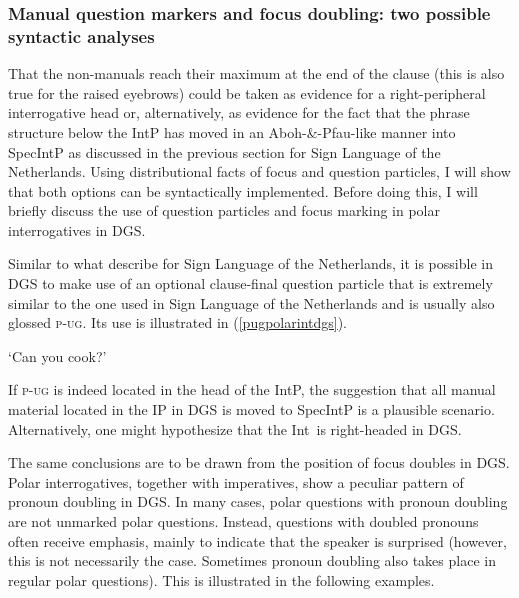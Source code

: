 \subsubsection{Manual question markers and focus doubling: two possible syntactic analyses}\label{manualquestionmarkers}
That the non-manuals reach their maximum at the end of the clause (this is also true for the raised eyebrows) could be taken as evidence for a right-peripheral interrogative head or, alternatively, as evidence for the fact that the phrase structure below the IntP has moved in an Aboh-\&-Pfau-like manner into SpecIntP as discussed in the previous section for Sign Language of the Netherlands. Using distributional facts of focus and question particles, I will show that both options can be syntactically implemented. Before doing this, I will briefly discuss the use of question particles and focus marking in polar interrogatives in DGS.

Similar to what \citet{aboh2010sa} describe for Sign Language of the Netherlands, it is possible in DGS to make use of an optional clause-final question particle that is extremely similar to the one used in Sign Language of the Netherlands and is usually also glossed \textsc{p-ug}. Its use is illustrated in (\ref{pugpolarintdgs}).

\begin{exe}
\ex {}
\glt `Can you cook?'\label{pugpolarintdgs}
\end{exe}

\noindent If \textsc{p-ug} is indeed located in the head of the IntP, the suggestion that all manual material located in the IP in DGS is moved to SpecIntP is a plausible scenario. Alternatively, one might hypothesize that the Int\textdegree\ is right-headed in DGS. 

The same conclusions are to be drawn from the position of focus doubles in DGS. Polar interrogatives, together with imperatives, show a peculiar pattern of pronoun doubling in DGS. In many cases, polar questions with pronoun doubling are not unmarked polar questions. Instead, questions with doubled pronouns often receive emphasis, mainly to indicate that the speaker is surprised (however, this is not necessarily the case. Sometimes pronoun doubling also takes place in regular polar questions). This is illustrated in the following examples.

